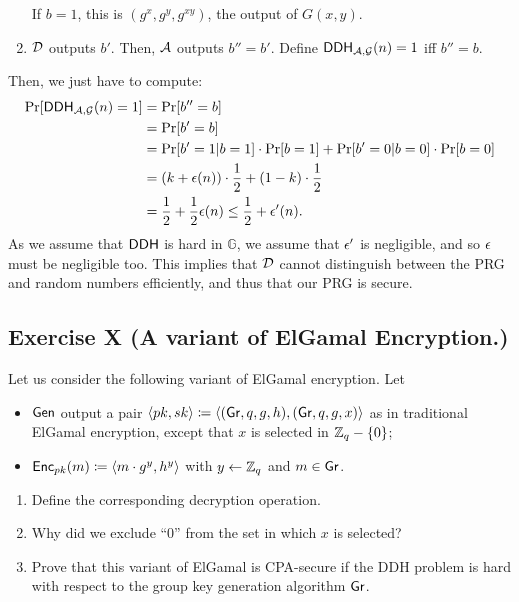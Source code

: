 \begin{solution}
\begin{enumerate}
		If $b=1$, this is $(g^x, g^y, g^{xy})$, the output of $G(x, y)$.

		\item $\mathcal{D}$ outputs $b'$. Then, $\mathcal{A}$ outputs $b''=b'$. Define $\mathsf{DDH}_{\mathcal{A}, \mathcal{G}}(n)=1$ iff $b''=b$.
	\end{enumerate}
	Then, we just have to compute:
	\begin{align*}
	\Pr[\mathsf{DDH}_{\mathcal{A}, \mathcal{G}}(n)=1] &= \Pr[b''=b] \\
	&= \Pr[b'=b] \\
	&= \Pr[b'=1 | b=1] \cdot \Pr[b=1] + \Pr[b'=0 | b=0] \cdot \Pr[b=0] \\
	&= (k + \epsilon(n)) \cdot \frac12 + (1-k) \cdot \frac12 \\
	&= \frac12 + \frac12 \epsilon(n) \le \frac12 + \epsilon'(n).
	\end{align*}
	As we assume that $\mathsf{DDH}$ is hard in $\mathbb{G}$, we assume that $\epsilon'$ is negligible, and so $\epsilon$ must be negligible too.
	This implies that $\mathcal{D}$ cannot distinguish between the PRG and random numbers efficiently, and thus that our PRG is secure.
\end{solution}



\subsection{Exercise X (A variant of ElGamal Encryption.)}

Let us consider the following variant of ElGamal encryption.  Let
\begin{itemize}
	\item $\operatorname{\mathsf{Gen}}$ output a pair
	$\langle pk, sk \rangle \coloneqq \langle(\operatorname{\mathsf{Gr}}, q, g, h), (\operatorname{\mathsf{Gr}}, q, g, x)
	\rangle$ as in traditional ElGamal encryption, except that $x$ is selected in $\mathbb{Z}_q - \{0\}$;
	\item $\operatorname{\mathsf{Enc}}_{pk}(m) \coloneqq \langle m\cdot g^y, h^y\rangle$ with $y \leftarrow \mathbb{Z}_q$ and $m \in \operatorname{\mathsf{Gr}}$.
\end{itemize}

\begin{enumerate}
	\item Define the corresponding decryption operation.
	\item Why did we exclude ``0'' from the set in which $x$ is selected?
	\item Prove that this variant of ElGamal is CPA-secure if the DDH
	problem is hard with respect to the group key generation algorithm $\operatorname{\mathsf{Gr}}$.
\end{enumerate}


